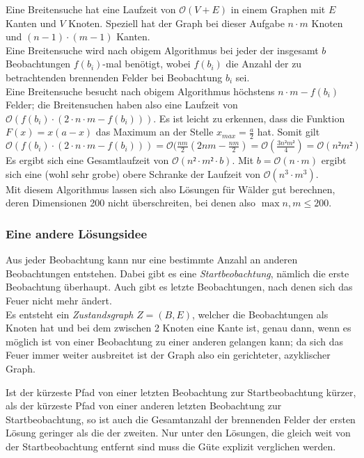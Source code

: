 Eine Breitensuche hat eine Laufzeit von $\mathcal{O}(V + E)$ in einem Graphen mit $E$ Kanten und $V$ Knoten. Speziell hat der Graph bei dieser Aufgabe $n\cdot m$ Knoten und $(n-1)\cdot (m-1)$ Kanten.\\
Eine Breitensuche wird nach obigem Algorithmus bei jeder der insgesamt $b$ Beobachtungen $f(b_i)$-mal benötigt, wobei $f(b_i)$ die Anzahl der zu betrachtenden brennenden Felder bei Beobachtung $b_i$ sei.\\
Eine Breitensuche besucht nach obigem Algorithmus höchstens $n\cdot m - f(b_i)$ Felder; die Breitensuchen haben also eine Laufzeit von $\mathcal{O}(f(b_i)\cdot (2\cdot n\cdot m - f(b_i)))$. Es ist leicht zu erkennen, dass die Funktion $F(x) = x(a-x)$ das Maximum an der Stelle $x_{max} = \frac{a}{2}$ hat. Somit gilt $\mathcal{O}(f(b_i)\cdot (2\cdot n\cdot m - f(b_i))) = \mathcal{O}(\frac{nm}{2}(2nm - \frac{nm}{2}) = \mathcal{O}(\frac{3n²m²}{4}) = \mathcal{O}(n²m²)$
 Es ergibt sich eine Gesamtlaufzeit von $\mathcal{O}(n²\cdot m² \cdot b)$. Mit $b = \mathcal{O}(n\cdot m)$ ergibt sich eine (wohl sehr grobe) obere Schranke der Laufzeit von $\mathcal{O}(n^3 \cdot m^3)$.\\
Mit diesem Algorithmus lassen sich also Lösungen für Wälder gut berechnen, deren Dimensionen 200 nicht überschreiten, bei denen also $\max{n,m} \leq 200$.

\subsubsection{Eine andere Lösungsidee}

Aus jeder Beobachtung kann nur eine bestimmte Anzahl an anderen Beobachtungen entstehen. Dabei gibt es eine \emph{Startbeobachtung}, nämlich die erste Beobachtung überhaupt. Auch gibt es letzte Beobachtungen, nach denen sich das Feuer nicht mehr ändert. \\
Es entsteht ein \emph{Zustandsgraph} $Z = (B,E)$, welcher die Beobachtungen als Knoten hat und bei dem zwischen 2 Knoten eine Kante ist, genau dann, wenn es möglich ist von einer Beobachtung zu einer anderen gelangen kann; da sich das Feuer immer weiter ausbreitet ist der Graph also ein gerichteter, azyklischer Graph.

Ist der kürzeste Pfad von einer letzten Beobachtung zur Startbeobachtung kürzer, als der kürzeste Pfad von einer anderen letzten Beobachtung zur Startbeobachtung, so ist auch die Gesamtanzahl der brennenden Felder der ersten Lösung geringer als die der zweiten. Nur unter den Lösungen, die gleich weit von der Startbeobachtung entfernt sind muss die Güte explizit verglichen werden.

